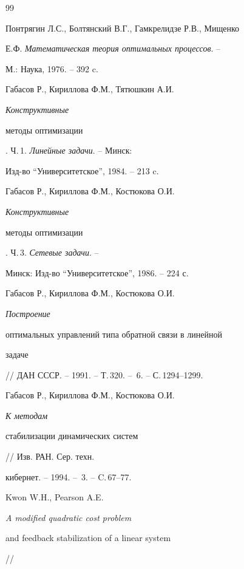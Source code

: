 \begin{thebibliography}{99}







Понтрягин Л.С., Болтянский В.Г., Гамкрелидзе Р.В., Мищенко


Е.Ф. {\em Математическая теория оптимальных процессов}. --


М.: Наука, 1976. -- 392 c.







Габасов Р., Кириллова Ф.М., Тятюшкин А.И. {\em Конструктивные


методы оптимизации}. Ч.\,1. {\em Линейные задачи}. -- Минск:


Изд-во ``Университетское'', 1984. -- 213 c.







Габасов Р., Кириллова Ф.М., Костюкова О.И. {\em Конструктивные


методы оптимизации}. Ч.\,3. {\em Сетевые задачи}. --


Минск: Изд-во ``Университетское'', 1986. -- 224 с.







Габасов Р., Кириллова Ф.М., Костюкова О.И. {\em Построение


оптимальных управлений типа обратной связи в линейной


задаче} // ДАН СССР. -- 1991. -- Т.\,320. -- \No\,6. -- С.\,1294--1299.







Габасов Р., Кириллова Ф.М., Костюкова О.И. {\em К методам


стабилизации динамических систем} // Изв. РАН. Сер. техн.


кибернет. -- 1994. -- \No\,3. -- C.\,67--77.







Kwon W.H., Pearson A.E. {\em A modified quadratic cost problem


and feedback stabilization of a linear system} //



\end{thebibliography}
